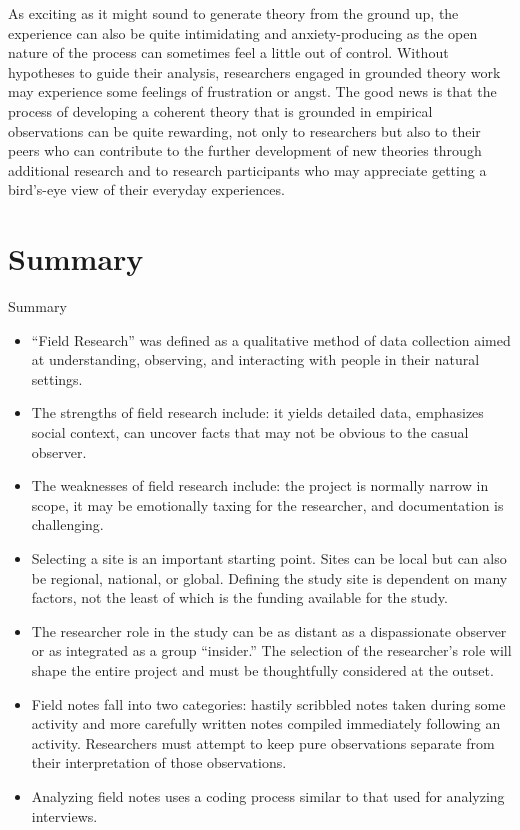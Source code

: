 As exciting as it might sound to generate theory from the ground up, the experience can also be quite intimidating and anxiety-producing as the open nature of the process can sometimes feel a little out of control. Without hypotheses to guide their analysis, researchers engaged in grounded theory work may experience some feelings of frustration or angst. The good news is that the process of developing a coherent theory that is grounded in empirical observations can be quite rewarding, not only to researchers but also to their peers who can contribute to the further development of new theories through additional research and to research participants who may appreciate getting a bird’s-eye view of their everyday experiences.

\section{Summary}\label{ch11:summary}

\begin{center}
	\begin{tkawybox}{Summary}
		\begin{itemize}
			\item ``Field Research'' was defined as a qualitative method of data collection aimed at understanding, observing, and interacting with people in their natural settings.
			\item The strengths of field research include: it yields detailed data, emphasizes social context, can uncover facts that may not be obvious to the casual observer.
			\item The weaknesses of field research include: the project is normally narrow in scope, it may be emotionally taxing for the researcher, and documentation is challenging.
			\item Selecting a site is an important starting point. Sites can be local but can also be regional, national, or global. Defining the study site is dependent on many factors, not the least of which is the funding available for the study.
			\item The researcher role in the study can be as distant as a dispassionate observer or as integrated as a group ``insider.'' The selection of the researcher's role will shape the entire project and must be thoughtfully considered at the outset.
			\item Field notes fall into two categories: hastily scribbled notes taken during some activity and more carefully written notes compiled immediately following an activity. Researchers must attempt to keep pure observations separate from their interpretation of those observations.
			\item Analyzing field notes uses a coding process similar to that used for analyzing interviews.
		\end{itemize}
	\end{tkawybox}
\end{center}
